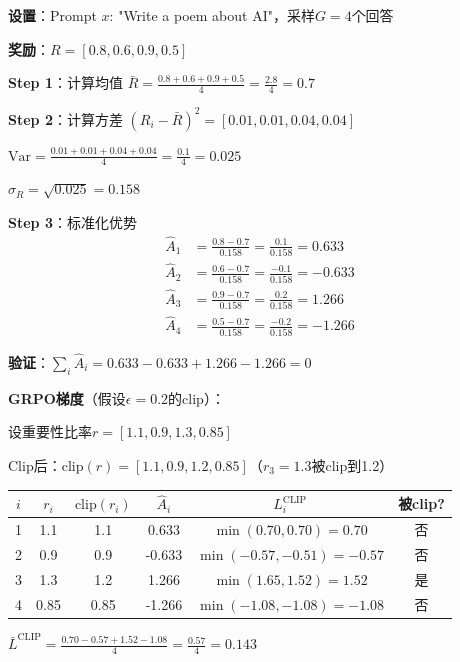 \documentclass[11pt,a4paper]{article}
\theoremstyle{definition}
\begin{document}
\begin{calculation}
\textbf{设置}：Prompt $x$: "Write a poem about AI"，采样$G = 4$个回答

\textbf{奖励}：$R = [0.8, 0.6, 0.9, 0.5]$

\textbf{Step 1}：计算均值
$\bar{R} = \frac{0.8 + 0.6 + 0.9 + 0.5}{4} = \frac{2.8}{4} = 0.7$

\textbf{Step 2}：计算方差
$(R_i - \bar{R})^2 = [0.01, 0.01, 0.04, 0.04]$

$\text{Var} = \frac{0.01 + 0.01 + 0.04 + 0.04}{4} = \frac{0.1}{4} = 0.025$

$\sigma_R = \sqrt{0.025} = 0.158$

\textbf{Step 3}：标准化优势
\begin{align*}
\hat{A}_1 &= \frac{0.8 - 0.7}{0.158} = \frac{0.1}{0.158} = 0.633 \\
\hat{A}_2 &= \frac{0.6 - 0.7}{0.158} = \frac{-0.1}{0.158} = -0.633 \\
\hat{A}_3 &= \frac{0.9 - 0.7}{0.158} = \frac{0.2}{0.158} = 1.266 \\
\hat{A}_4 &= \frac{0.5 - 0.7}{0.158} = \frac{-0.2}{0.158} = -1.266
\end{align*}

\textbf{验证}：$\sum_i \hat{A}_i = 0.633 - 0.633 + 1.266 - 1.266 = 0$ \checkmark

\textbf{GRPO梯度}（假设$\epsilon = 0.2$的clip）：

设重要性比率$r = [1.1, 0.9, 1.3, 0.85]$

Clip后：$\text{clip}(r) = [1.1, 0.9, 1.2, 0.85]$（$r_3 = 1.3$被clip到1.2）

\begin{center}
\begin{tabular}{c|cccc|c}
\toprule
$i$ & $r_i$ & $\text{clip}(r_i)$ & $\hat{A}_i$ & $L_i^{\text{CLIP}}$ & 被clip? \\
\midrule
1 & 1.1 & 1.1 & 0.633 & $\min(0.70, 0.70) = 0.70$ & 否 \\
2 & 0.9 & 0.9 & -0.633 & $\min(-0.57, -0.51) = -0.57$ & 否 \\
3 & 1.3 & 1.2 & 1.266 & $\min(1.65, 1.52) = 1.52$ & 是 \\
4 & 0.85 & 0.85 & -1.266 & $\min(-1.08, -1.08) = -1.08$ & 否 \\
\bottomrule
\end{tabular}
\end{center}

$\bar{L}^{\text{CLIP}} = \frac{0.70 - 0.57 + 1.52 - 1.08}{4} = \frac{0.57}{4} = 0.143$
\end{calculation}
\end{document}

